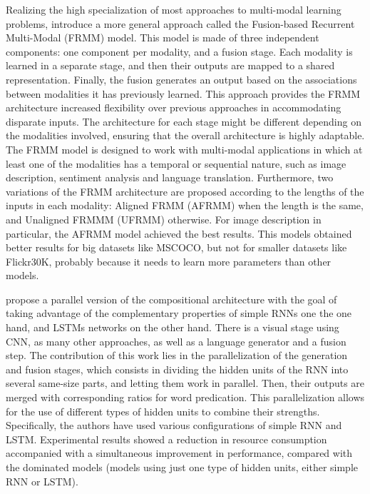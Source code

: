 Realizing the high specialization of most approaches to multi-modal learning problems, \citet{Oruganti2016} introduce a more general approach called the Fusion-based Recurrent Multi-Modal (FRMM) model. This model is made of three independent components: one component per modality, and a fusion stage. Each modality is learned in a separate stage, and then their outputs are mapped to a shared representation. Finally, the fusion generates an output based on the associations between modalities it has previously learned. This approach provides the FRMM architecture increased flexibility over previous approaches in accommodating disparate inputs. The architecture for each stage might be different depending on the modalities involved, ensuring that the overall architecture is highly adaptable. The FRMM model is designed to work with multi-modal applications in which at least one of the modalities has a temporal or sequential nature, such as image description, sentiment analysis and language translation. Furthermore, two variations of the FRMM architecture are proposed according to the lengths of the inputs in each modality: Aligned FRMM (AFRMM) when the length is the same, and Unaligned FRMMM (UFRMM) otherwise. For image description in particular, the AFRMM model achieved the best results. This models obtained better results for big datasets like MSCOCO, but not for smaller datasets like Flickr30K, probably because it needs to learn more parameters than other models. 

\citet{Wang2016_Parallel} propose a parallel version of the compositional architecture with the goal of taking advantage of the complementary properties of simple RNNs one the one hand, and LSTMs networks on the other hand. There is a visual stage using CNN, as many other approaches, as well as a language generator and a fusion step. The contribution of this work lies in the parallelization of the generation and fusion stages, which consists in dividing the hidden units of the RNN into several same-size parts, and letting them work in parallel. Then, their outputs are merged with corresponding ratios for word predication. This parallelization allows for the use of different types of hidden units to combine their strengths. Specifically, the authors have used various configurations of simple RNN and LSTM. Experimental results showed a reduction in resource consumption accompanied with a simultaneous improvement in performance, compared with the dominated models (models using just one type of hidden units, either simple RNN or LSTM).

